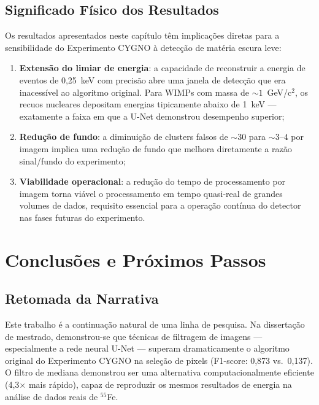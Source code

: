 \documentclass[
       oneside,
       english,
       brazil
       ]{abntbibufjf}
\begin{document}
\section{Significado Físico dos Resultados}
\label{sec:discussion}

Os resultados apresentados neste capítulo têm implicações diretas para a
sensibilidade do Experimento CYGNO à detecção de matéria escura leve:

\begin{enumerate}
    \item \textbf{Extensão do limiar de energia}: a capacidade de reconstruir
    a energia de eventos de 0,25~keV com precisão abre uma janela de
    detecção que era inacessível ao algoritmo original. Para WIMPs com massa
    de ${\sim}1$~GeV/c$^2$, os recuos nucleares depositam energias
    tipicamente abaixo de 1~keV — exatamente a faixa em que a U-Net
    demonstrou desempenho superior;
    \item \textbf{Redução de fundo}: a diminuição de clusters falsos de
    ${\sim}30$ para ${\sim}3$--$4$ por imagem implica uma redução de
    fundo que melhora diretamente a razão sinal/fundo do experimento;
    \item \textbf{Viabilidade operacional}: a redução do tempo de
    processamento por imagem torna viável o processamento em tempo quasi-real
    de grandes volumes de dados, requisito essencial para a operação
    contínua do detector nas fases futuras do experimento.
\end{enumerate}


\chapter{Conclusões e Próximos Passos}
\label{chap:conclusions}

\section{Retomada da Narrativa}
\label{sec:narrative}

Este trabalho é a continuação natural de uma linha de pesquisa. Na dissertação
de mestrado, demonstrou-se que técnicas de filtragem de imagens — especialmente
a rede neural U-Net — superam dramaticamente o algoritmo original do
Experimento CYGNO na seleção de pixels (F1-score: 0,873 vs.\ 0,137). O filtro
de mediana demonstrou ser uma alternativa computacionalmente eficiente
(4,3$\times$ mais rápido), capaz de reproduzir os mesmos resultados de energia
na análise de dados reais de $^{55}$Fe.
\end{document}
